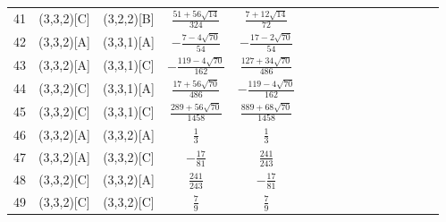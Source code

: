\documentclass[11pt]{article}
\begin{document}
\begin{longtable}{ | p{1cm}| *{15}{c|} }
41 & (3,3,2)[C] & (3,2,2)[B] & $\frac{51+56\sqrt{14}}{324}$ & $\frac{7+12\sqrt{14}}{72}$\\
42 & (3,3,2)[A] & (3,3,1)[A] & $-\frac{7-4\sqrt{70}}{54}$ & $-\frac{17-2\sqrt{70}}{54}$\\
43 & (3,3,2)[A] & (3,3,1)[C] & $-\frac{119-4\sqrt{70}}{162}$ & $\frac{127+34\sqrt{70}}{486}$\\
44 & (3,3,2)[C] & (3,3,1)[A] & $\frac{17+56\sqrt{70}}{486}$ & $-\frac{119-4\sqrt{70}}{162}$\\
45 & (3,3,2)[C] & (3,3,1)[C] & $\frac{289+56\sqrt{70}}{1458}$ & $\frac{889+68\sqrt{70}}{1458}$\\
46 & (3,3,2)[A] & (3,3,2)[A] & $\frac{1}{3}$ & $\frac{1}{3}$\\
47 & (3,3,2)[A] & (3,3,2)[C] & $-\frac{17}{81}$ & $\frac{241}{243}$\\
48 & (3,3,2)[C] & (3,3,2)[A] & $\frac{241}{243}$ & $-\frac{17}{81}$\\
49 & (3,3,2)[C] & (3,3,2)[C] & $\frac{7}{9}$ & $\frac{7}{9}$\\
\end{longtable}
\end{document}
